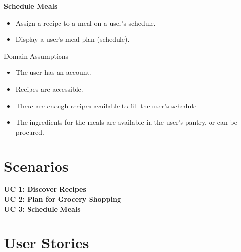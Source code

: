 \documentclass[11pt, letterpaper]{report}
\begin{document}
\noindent \textbf{Schedule Meals}
\begin{itemize}
    \item Assign a recipe to a meal on a user’s schedule.
    \item Display a user’s meal plan (schedule).
\end{itemize}
Domain Assumptions
\begin{itemize}
    \item The user has an account.
    \item Recipes are accessible.
    \item There are enough recipes available to fill the user’s schedule.
    \item The ingredients for the meals are available in the user’s pantry, or can be procured.
\end{itemize}

\chapter{Scenarios}
\noindent \textbf{UC 1: Discover Recipes} \\

\noindent \textbf{UC 2: Plan for Grocery Shopping} \\

\noindent \textbf{UC 3: Schedule Meals} \\

\chapter{User Stories}
\end{document}
